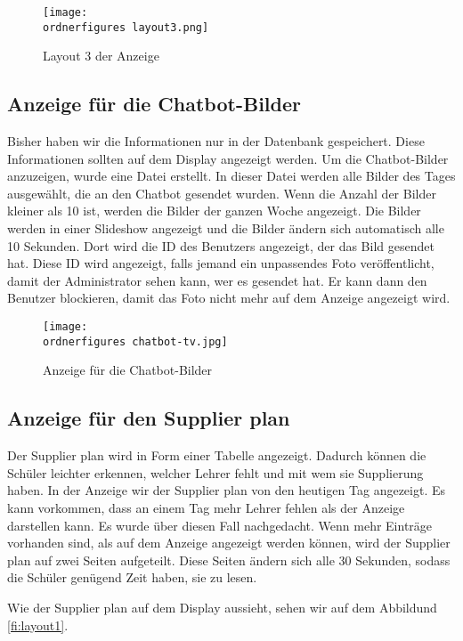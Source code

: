 \begin{figure}[H]
	\centering
	\texttt{[image: \\ordnerfigures layout3.png]}
	\caption{Layout 3 der Anzeige}
	\label{fi:layout3}
\end{figure}

\subsection{Anzeige für die Chatbot-Bilder}

Bisher haben wir die Informationen nur in der Datenbank gespeichert. Diese Informationen sollten auf dem Display angezeigt werden. Um die Chatbot-Bilder anzuzeigen, wurde eine Datei erstellt. In dieser Datei werden alle Bilder des Tages ausgewählt, die an den Chatbot gesendet wurden. Wenn die Anzahl der Bilder kleiner als 10 ist, werden die Bilder der ganzen Woche angezeigt. Die Bilder werden in einer Slideshow angezeigt und die Bilder ändern sich automatisch alle 10 Sekunden.
Dort wird die ID des Benutzers angezeigt, der das Bild gesendet hat. Diese ID wird angezeigt, falls jemand ein unpassendes Foto veröffentlicht, damit der Administrator sehen kann, wer es gesendet hat. Er kann dann den Benutzer blockieren, damit das Foto nicht mehr auf dem Anzeige angezeigt wird.

\begin{figure}[H]
	\centering
	\texttt{[image: \\ordnerfigures chatbot-tv.jpg]}
	\caption{Anzeige für die Chatbot-Bilder}
	\label{fi:chatbot}
\end{figure}

\subsection{Anzeige für den Supplier plan}

Der Supplier plan wird in Form einer Tabelle angezeigt. Dadurch können die Schüler leichter erkennen, welcher Lehrer fehlt und mit wem sie Supplierung haben. In der Anzeige wir der Supplier plan von den heutigen Tag angezeigt. Es kann vorkommen, dass an einem Tag mehr Lehrer fehlen als der Anzeige darstellen kann. Es wurde über diesen Fall nachgedacht. Wenn mehr Einträge vorhanden sind, als auf dem Anzeige angezeigt werden  können, wird der Supplier plan auf zwei Seiten aufgeteilt. Diese Seiten ändern sich alle 30 Sekunden, sodass die Schüler genügend Zeit haben, sie zu lesen.

Wie der Supplier plan auf dem Display aussieht, sehen wir auf dem Abbildund \ref{fi:layout1}.

